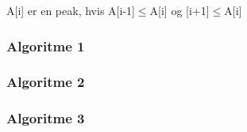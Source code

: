 A[i] er en peak, hvis A[i-1]$\leq$A[i] og [i+1]$\leq$A[i]
\subsubsection{Algoritme 1}


\subsubsection{Algoritme 2}


\subsubsection{Algoritme 3}
